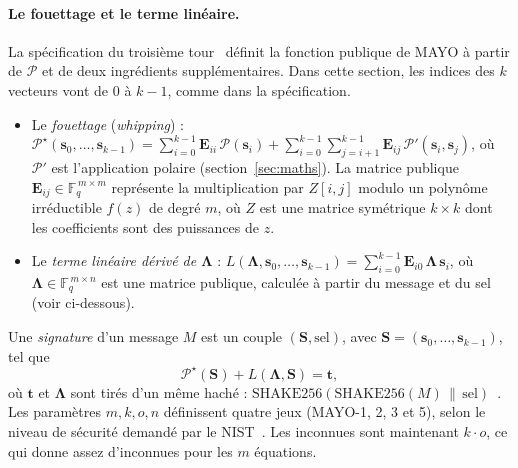 \paragraph{Le fouettage et le terme linéaire.} La spécification du troisième tour~\cite{mayospec} définit la fonction publique de MAYO à partir de $\mathcal{P}$ et de deux ingrédients supplémentaires. Dans cette section, les indices des $k$ vecteurs vont de $0$ à $k-1$, comme dans la spécification.
\begin{itemize}[itemsep=1pt]
\item Le \emph{fouettage} (\emph{whipping}) : $\displaystyle\mathcal{P}^\star(\mathbf{s}_0,\dots,\mathbf{s}_{k-1})=\sum_{i=0}^{k-1}\mathbf{E}_{ii}\,\mathcal{P}(\mathbf{s}_i)+\sum_{i=0}^{k-1}\sum_{j=i+1}^{k-1}\mathbf{E}_{ij}\,\mathcal{P}'(\mathbf{s}_i,\mathbf{s}_j)$, où $\mathcal{P}'$ est l'application polaire (section~\ref{sec:maths}). La matrice publique $\mathbf{E}_{ij}\in\mathbb{F}_q^{\,m\times m}$ représente la multiplication par $Z[i,j]$ modulo un polynôme irréductible $f(z)$ de degré $m$, où $Z$ est une matrice symétrique $k\times k$ dont les coefficients sont des puissances de $z$.
\item Le \emph{terme linéaire dérivé de $\boldsymbol{\Lambda}$} : $\displaystyle L(\boldsymbol{\Lambda},\mathbf{s}_0,\dots,\mathbf{s}_{k-1})=\sum_{i=0}^{k-1}\mathbf{E}_{i0}\,\boldsymbol{\Lambda}\,\mathbf{s}_i$, où $\boldsymbol{\Lambda}\in\mathbb{F}_q^{\,m\times n}$ est une matrice publique, calculée à partir du message et du sel (voir ci-dessous).
\end{itemize}
Une \emph{signature} d'un message $M$ est un couple $(\mathbf{S},\text{sel})$, avec $\mathbf{S}=(\mathbf{s}_0,\dots,\mathbf{s}_{k-1})$, tel que
\[\mathcal{P}^\star(\mathbf{S})+L(\boldsymbol{\Lambda},\mathbf{S})=\mathbf{t},\]
où $\mathbf{t}$ et $\boldsymbol{\Lambda}$ sont tirés d'un même haché : $\mathrm{SHAKE256}(\mathrm{SHAKE256}(M)\,\|\,\text{sel})$~\cite{mayospec}. Les paramètres $m,k,o,n$ définissent quatre jeux (MAYO-1, 2, 3 et 5), selon le niveau de sécurité demandé par le NIST~\cite{nistadd}. Les inconnues sont maintenant $k\cdot o$, ce qui donne assez d'inconnues pour les $m$ équations.

